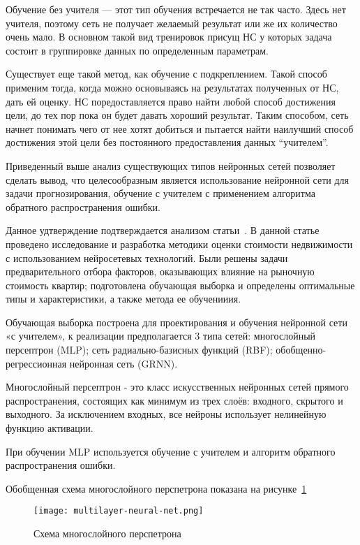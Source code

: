 Обучение без учителя — этот тип обучения встречается не так часто. Здесь нет учителя, поэтому сеть не получает
желаемый результат или же их количество очень мало. В основном такой вид тренировок присущ НС у которых задача
состоит в группировке данных по определенным параметрам.

Существует еще такой метод, как обучение с подкреплением. Такой способ применим тогда, когда можно основываясь на
результатах полученных от НС, дать ей оценку. НС поредоставляется право найти любой способ достижения цели, до тех пор
пока он будет давать хороший результат. Таким способом, сеть начнет понимать чего от нее хотят добиться и пытается
найти наилучший способ достижения этой цели без постоянного предоставления данных “учителем”.

Приведенный выше анализ существующих типов нейронных сетей позволяет сделать вывод, что целесообразным является
использование нейронной сети для задачи прогнозирования, обучение с учителем с применением алгоритма обратного
распространения ошибки.

Данное удтверждение подтверждается анализом статьи~\cite{using_neural_engines}. В данной статье проведено
исследование и разработка методики оценки стоимости \linebreak недвижимости с использованием нейросетевых технологий. Были решены
задачи предварительного отбора факторов, оказывающих влияние на рыночную стоимость квартир; подготовлена обучающая выборка
и определены оптимальные типы и характеристики, а также метода ее обученииия.

Обучающая выборка построена для проектирования и обучения нейронной сети «с учителем», к реализации
предполагается 3 типа сетей: многослойный персептрон (MLP); сеть радиально-базисных функций (RBF);\linebreak
обобщенно-регрессионная нейронная сеть (GRNN).

Многослойный персептрон - это класс искусственных нейронных сетей прямого распространения, состоящих как минимум из
трех слоёв: входного, скрытого и выходного. За исключением входных, все нейроны использует нелинейную функцию активации.

При обучении MLP используется обучение с учителем и алгоритм обратного распространения ошибки.

Обобщенная схема многослойного перспетрона показана на \linebreak рисунке~\ref{fig:analysis:multilayer-neural-net}

\begin{figure}[!ht]
  \centering
  \texttt{[image: multilayer-neural-net.png]} 
  \caption{Схема многослойного перспетрона}
  \label{fig:analysis:multilayer-neural-net}
\end{figure}

